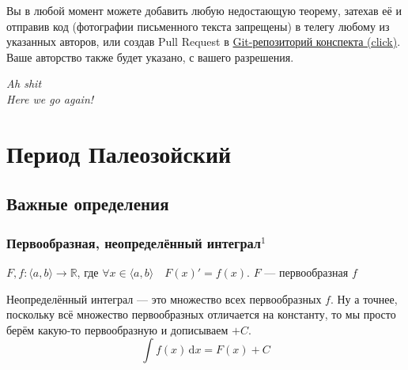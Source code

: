 \documentclass{article}
\def\D{\,\mathrm{d}}
\begin{document}
Вы в любой момент можете добавить любую недостающую теорему, затехав её и отправив код (фотографии письменного текста запрещены) в телегу любому из указанных авторов, или создав Pull Request в \href{https://github.com/snitron/ct-itmo}{Git-репозиторий конспекта (click)}. Ваше авторство также будет указано, с вашего разрешения.
\newpage

\begin{flushright}
\emph{Ah shit\\
Here we go again!}
\end{flushright}

\tableofcontents


\setlength{\parskip}{6pt}%
\newpage
{}


\section{Период Палеозойский}
\subsection{Важные определения}
\subsubsection{Первообразная, неопределённый интеграл\texorpdfstring{$^1$}{}}
$F, f: \langle a, b \rangle \rightarrow \mathbb{R}$, где $\forall x \in \langle a, b \rangle \quad F(x)' = f(x)$. $F$ --- первообразная $f$

Неопределённый интеграл --- это множество всех первообразных $f$. Ну а точнее, поскольку всё множество первообразных отличается на константу, то мы просто берём какую-то первообразную и дописываем $+C$.
$$
\int f(x) \D{x} = F(x) + C
$$
\end{document}
